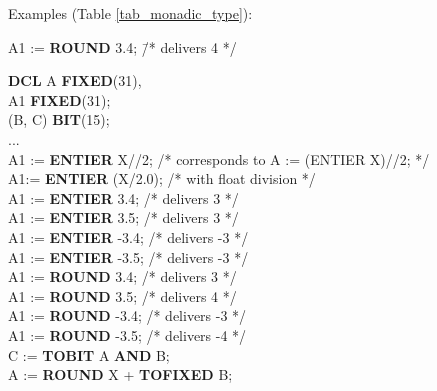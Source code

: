 Examples (Table \ref{tab_monadic_type}):
\begin{tabbing}
A1 := {\bf ROUND} 3.4; \x \x \=  /* delivers 4 */ \kill 

{\bf DCL} A {\bf FIXED}(31),\\
\x A1 {\bf FIXED}(31);\\
\x (B, C) {\bf BIT}(15);\\
...\\
A1 := {\bf ENTIER} X//2; \> /* corresponds to A := (ENTIER X)//2; */ \\
A1:= {\bf ENTIER} (X/2.0); \> /* with float division */\\
A1 := {\bf ENTIER} 3.4; \> /* delivers 3 */ \\
A1 := {\bf ENTIER} 3.5; \> /* delivers 3 */ \\
A1 := {\bf ENTIER} -3.4; \> /* delivers -3 */ \\
A1 := {\bf ENTIER} -3.5; \> /* delivers -3 */ \\
A1 := {\bf ROUND} 3.4;  \>  /* delivers 3 */ \\
A1 := {\bf ROUND} 3.5;  \>  /* delivers 4 */ \\
A1 := {\bf ROUND} -3.4; \> /* delivers -3 */ \\
A1 := {\bf ROUND} -3.5; \> /* delivers -4 */ \\
C := {\bf TOBIT} A {\bf AND} B;\\
A := {\bf ROUND} X + {\bf TOFIXED} B;
\end{tabbing}


